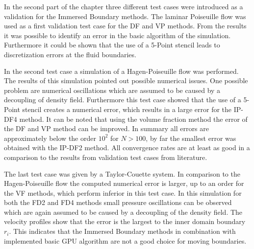 In the second part of the chapter three different test cases were introduced as a validation for the Immersed Boundary methods.
The laminar Poiseuille flow was used as a first validation test case for the DF and VP methods.
From the results it was possible to identify an error in the basic algorithm of the simulation.
Furthermore it could be shown that the use of a 5-Point stencil leads to discretization errors at the fluid boundaries.

In the second test case a simulation of a Hagen-Poiseuille flow was performed.
The results of this simulation pointed out possible numerical issues.
One possible problem are numerical oscillations which are assumed to be caused
by a decoupling of density field.
Furthermore this test case showed that the use of a 5-Point stencil creates a numerical error,
which results in a large error for the IP-DF4 method.
It can be noted that using the volume fraction method  the error of the DF and VP method can be improved.
In summary all errors are approximately below the order  $10^2$ for $N>100$,
by far the smallest error was obtained with the IP-DF2 method.
All convergence rates are at least as good in a comparison
to the results from validation test cases from literature.

The last test case was given by a Taylor-Couette system.
In comparison to the Hagen-Poiseuille flow the computed numerical error is larger,
up to an order for the VF methods, which perform inferior in this test case.
In this simulation for both the FD2 and FD4 methods small pressure oscillations can be observed which are again assumed to be
caused by a decoupling of the density field.
The velocity profiles show that the error is the largest to the inner domain boundary $r_i$.
This indicates that the Immersed Boundary methods in combination with implemented basic GPU algorithm
are not a good choice for moving boundaries.




